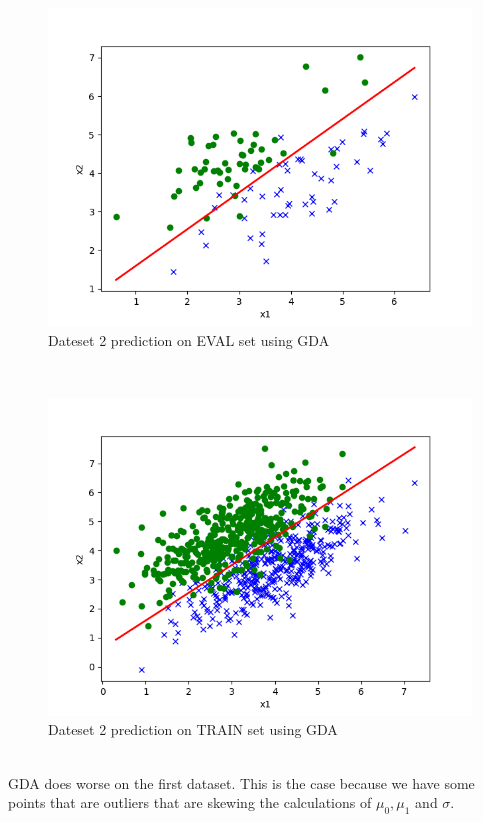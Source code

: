 \begin{answer}
\begin{figure}
  \includegraphics[width=\linewidth]{p01e_pred_2_eval.png}
  \caption{Dateset 2 prediction on EVAL set using GDA}
  \label{fig:Dateset 2 prediction on EVAL set using GDA}
\end{figure}\\
\begin{figure}
  \includegraphics[width=\linewidth]{p01e_pred_2_train.png}
  \caption{Dateset 2 prediction on TRAIN set using GDA}
  \label{fig:Dateset 2 prediction on TRAIN set using GDA}
\end{figure}\\
GDA does worse on the first dataset. This is the case because we have some points that are outliers that are skewing the calculations of $\mu_0, \mu_1$ and $\sigma$. 
\end{answer}
